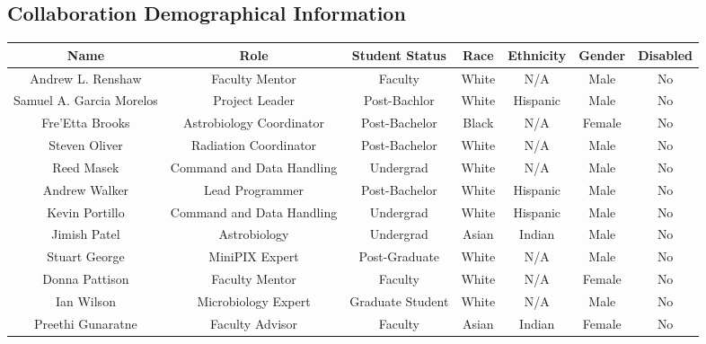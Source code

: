 \begin{appendices}
  \section{Collaboration Demographical Information}
\begin{table}[h!]
\centering  
  \begin{tabular}  {ccccccc}
  	\hline
	\hline
    \textbf{Name} &  \textbf{Role} & \textbf{Student Status} & \textbf{Race} & \textbf{Ethnicity} & \textbf{Gender} & \textbf{Disabled}\\
 	\hline
 	Andrew L. Renshaw & Faculty Mentor & Faculty & White & N/A & Male & No\\
 	\hline
 	Samuel A. Garcia Morelos & Project Leader & Post-Bachlor & White & Hispanic & Male & No\\
 	\hline
 	Fre'Etta Brooks & Astrobiology Coordinator & Post-Bachelor & Black & N/A & Female & No\\\hline
 	Steven Oliver & Radiation Coordinator & Post-Bachelor & White & N/A & Male & No\\\hline
 	Reed Masek & Command and Data Handling & Undergrad & White & N/A & Male & No\\\hline
 	Andrew Walker & Lead Programmer & Post-Bachelor & White & Hispanic & Male & No\\\hline
 	Kevin Portillo & Command and Data Handling & Undergrad & White & Hispanic & Male & No \\\hline
	Jimish Patel & Astrobiology & Undergrad & Asian & Indian & Male & No \\ \hline
	Stuart George & MiniPIX Expert & Post-Graduate & White & N/A & Male & No \\ \hline
	Donna Pattison & Faculty Mentor & Faculty & White & N/A & Female & No \\ \hline
	Ian Wilson & Microbiology Expert & Graduate Student & White & N/A & Male & No \\ \hline
	Preethi Gunaratne  & Faculty Advisor & Faculty & Asian & Indian & Female & No \\ \hline
	\end{tabular}	
	\end{table}  

\end{appendices}
